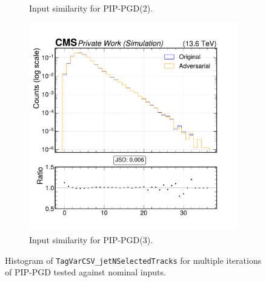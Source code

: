 \begin{figure}[h]
\begin{subfigure}[t]{0.32\textwidth}
    \caption*{Input similarity for PIP-PGD(2).}
  \end{subfigure}\hfill
  \begin{subfigure}[t]{0.32\textwidth}
    \includegraphics[width=\linewidth]{media/output/features/compare/combined_it_3/cmp_global_features_TagVarCSV_jetNSelectedTracks.pdf}
    \caption*{Input similarity for PIP-PGD(3).}
  \end{subfigure}

  \caption*{Histogram of \texttt{TagVarCSV\_jetNSelectedTracks} for multiple iterations of PIP-PGD tested against nominal inputs.}
  \label{fig:combined_input_TagVarCSV_jetNSelectedTracks}
\end{figure}

